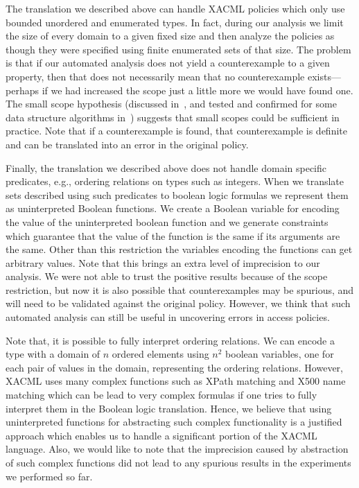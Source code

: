 The translation we described above can handle 
XACML policies which only use bounded unordered and enumerated types.
In fact, during our analysis we limit the size of every domain
to a given fixed size and then analyze the policies as though
they were specified using finite enumerated sets of that size. 
The problem is that if our automated analysis does not yield
a counterexample to a given property, then that does not necessarily mean that
no counterexample exists---perhaps if we had increased the scope just
a little more we would have found one. The small scope hypothesis
(discussed in~\cite{jackson:elements}, and tested and confirmed for
some data structure algorithms in~\cite{marinov:exhaustive}) suggests
that small scopes could be sufficient in practice. Note that if a
counterexample is found, that counterexample is definite and can be
translated into an error in the original policy.

Finally, the translation we described above does not handle domain specific
predicates, e.g., ordering relations on types such as integers.
When we translate sets described using such predicates to boolean logic
formulas we represent them as uninterpreted Boolean functions.
We create a Boolean
variable for encoding the value of the uninterpreted boolean function 
and we generate
constraints which guarantee that the value of the function is the same
if its arguments are the same. Other than this restriction the
variables encoding the functions can get arbitrary values.  Note that
this brings an extra level of imprecision to our analysis.  We were
not able to trust the positive results because of the scope
restriction, but now it is also possible that counterexamples may be
spurious, and will need to be validated against the original policy.
However, we think that such automated analysis can still be useful in
uncovering errors in access policies.

Note that, it is possible to fully interpret ordering relations.
We can encode a type with a domain of $n$
ordered elements using $n^2$ boolean variables, one for each pair of
values in the domain, representing the ordering relations.
However, XACML uses many complex functions such as XPath matching and X500
name matching which can be lead to very complex formulas if one tries to
fully interpret them in the Boolean logic translation.
Hence, we believe that using uninterpreted functions for abstracting such
complex functionality is a justified approach which enables us to handle
a significant portion of the XACML language.
Also, we would like to note that the imprecision caused by abstraction 
of such complex functions did not 
lead to any spurious results in the experiments we performed so far.

